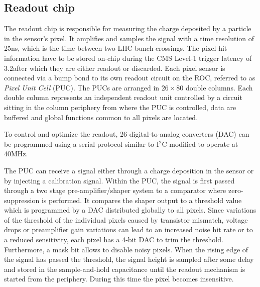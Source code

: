 \subsection{Readout chip}

The readout chip is responsible for measuring the charge deposited by a particle in the sensor's pixel.
It amplifies and samples the signal with a time resolution of 25\unit{ns}, which is the time between two LHC bunch crossings.
The pixel hit information have to be stored on-chip during the CMS Level-1 trigger latency of 3.2\mus after which they are either readout or discarded.
Each pixel sensor is connected via a bump bond to its own readout circuit on the ROC, referred to as {\it Pixel Unit Cell} (PUC). 
The PUCs are arranged in $26\times80$ double columns. Each double column represents an independent readout unit controlled by a circuit sitting in the column periphery from where the PUC is controlled, data are buffered and global functions common to all pixels are located.

To control and optimize the readout, 26 digital-to-analog converters (DAC) can be programmed using a serial protocol similar to I$^2$C modified to operate at 40\unit{MHz}.

The PUC can receive a signal either through a charge deposition in the sensor or by injecting a calibration signal.
Within the PUC, the signal is first passed through a two stage pre-amplifier/shaper system to a comparator where zero-suppression is performed.
It compares the shaper output to a threshold value which is programmed by a DAC distributed globally to all pixels.
Since variations of the threshold of the individual pixels caused by transistor mismatch, voltage drops or preamplifier gain variations can lead to an increased noise hit rate or to a reduced sensitivity, each pixel has a 4-bit DAC to trim the threshold. Furthermore, a mask bit allows to disable noisy pixels.
When the rising edge of the signal has passed the threshold, the signal height is sampled after some delay and stored in the sample-and-hold capacitance until the readout mechanism is started from the periphery. During this time the pixel becomes insensitive.

